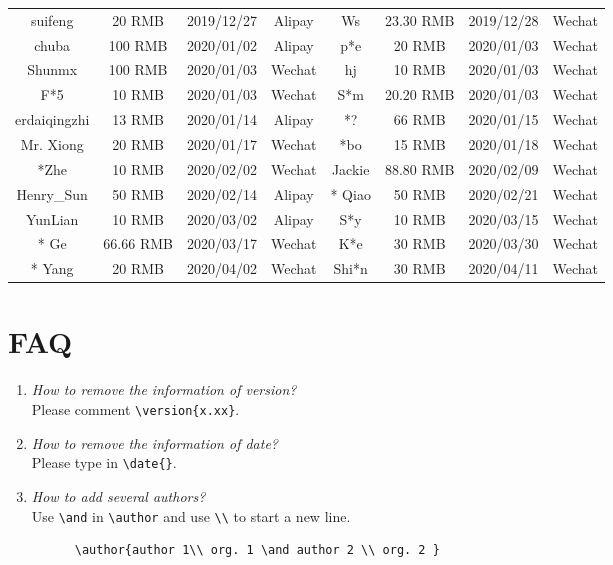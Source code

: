 \documentclass[en,hazy,device=normal,blue,14pt]{elegantnote}
\begin{document}
\begin{table}[htbp]
\begin{tabular}{cccccccc}
	  suifeng   & 20 RMB & 2019/12/27 & Alipay   & Ws    & 23.30 RMB & 2019/12/28 & Wechat \\
	  chuba    & 100 RMB  & 2020/01/02 & Alipay   & p*e   & 20 RMB & 2020/01/03 & Wechat \\
	  Shunmx & 100 RMB & 2020/01/03 & Wechat    & hj    & 10 RMB & 2020/01/03 & Wechat \\
	  F*5   & 10 RMB & 2020/01/03 & Wechat    & S*m   & 20.20 RMB & 2020/01/03 & Wechat \\
	  erdaiqingzhi  & 13 RMB & 2020/01/14 & Alipay   & *?    & 66 RMB & 2020/01/15 & Wechat \\
	  Mr. Xiong & 20 RMB & 2020/01/17 & Wechat    & *bo    & 15 RMB & 2020/01/18 & Wechat \\
	  *Zhe    & 10 RMB & 2020/02/02 & Wechat    &  Jackie &  88.80 RMB  &  2020/02/09 & Wechat \\
	  Henry\_Sun & 50 RMB & 2020/02/14 & Alipay & * Qiao  & 50 RMB & 2020/02/21 & Wechat \\
	  YunLian & 10 RMB & 2020/03/02 & Alipay & S*y  &  10 RMB  &  2020/03/15 & Wechat \\
	  * Ge  & 66.66 RMB & 2020/03/17 & Wechat    &   K*e & 30 RMB & 2020/03/30 & Wechat\\
	  * Yang  &  20 RMB  &  2020/04/02 & Wechat & Shi*n  & 30 RMB & 2020/04/11 & Wechat \\
\bottomrule
\end{tabular}%
  \label{tab:donation}%
\end{table}%


\section{FAQ}

\begin{enumerate}[label=\arabic*).]
	\item \textit{How to remove the information of version?}\\
    Please comment \lstinline|\version{x.xx}|.
	\item \textit{How to remove the information of date?}\\
	  Please type in \lstinline|\date{}|.
	\item \textit{How to add several authors?}\\
	  Use \lstinline{\and} in \lstinline{\author} and use \lstinline{\\} to start a new line.
    \begin{lstlisting}
      \author{author 1\\ org. 1 \and author 2 \\ org. 2 }
    \end{lstlisting}
\end{enumerate}
\end{document}

